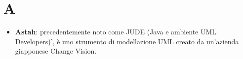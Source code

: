 \section{A}
\begin{itemize}
	\item \textbf{Astah}: precedentemente noto come JUDE (Java e ambiente UML Developers)', è uno strumento di modellazione UML creato da un'azienda giapponese Change Vision.
\end{itemize}
